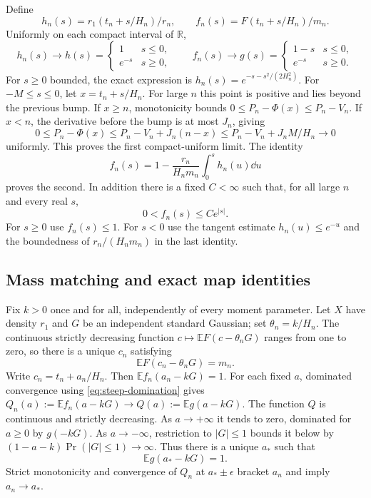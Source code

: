 \documentclass[11pt]{article}
\numberwithin{equation}{section}
\theoremstyle{remark}\newtheorem{remark}[theorem]{Remark}
\newcommand{\R}{\mathbb R}\newcommand{\E}{\mathbb E}
\begin{document}
Define
\[
 h_n(s)=r_1(t_n+s/H_n)/r_n,\qquad
 f_n(s)=F(t_n+s/H_n)/m_n.
\]
Uniformly on each compact interval of $\R$,
\begin{equation}\label{eq:steep-profile}
 h_n(s)\longrightarrow h(s)=
 \begin{cases}1&s\le0,\\e^{-s}&s\ge0,\end{cases}
 \qquad f_n(s)\longrightarrow g(s)=
 \begin{cases}1-s&s\le0,\\e^{-s}&s\ge0.\end{cases}
\end{equation}
For $s\ge0$ bounded, the exact expression is $h_n(s)=e^{-s-s^2/(2H_n^2)}$. For $-M\le s\le0$, let $x=t_n+s/H_n$. For large $n$ this point is positive and lies beyond the previous bump. If $x\ge n$, monotonicity bounds
$0\le P_n-\Phi(x)\le P_n-V_n$. If $x<n$, the derivative before the bump is at most $J_n$, giving
\[
 0\le P_n-\Phi(x)\le P_n-V_n+J_n(n-x)
                \le P_n-V_n+J_nM/H_n\longrightarrow0
\]
uniformly. This proves the first compact-uniform limit. The identity
\[
 f_n(s)=1-\frac{r_n}{H_nm_n}\int_0^s h_n(u)\dd u
\]
proves the second. In addition there is a fixed $C<\infty$ such that, for all large $n$ and every real $s$,
\begin{equation}\label{eq:steep-domination}
 0<f_n(s)\le Ce^{|s|}.
\end{equation}
For $s\ge0$ use $f_n(s)\le1$. For $s<0$ use the tangent estimate $h_n(u)\le e^{-u}$ and the boundedness of $r_n/(H_nm_n)$ in the last identity.

\subsection{Mass matching and exact map identities}
Fix $k>0$ once and for all, independently of every moment parameter. Let $X$ have density $r_1$ and $G$ be an independent standard Gaussian; set $\theta_n=k/H_n$. The continuous strictly decreasing function $c\mapsto\E F(c-\theta_nG)$ ranges from one to zero, so there is a unique $c_n$ satisfying
\begin{equation}\label{eq:steep-match}
 \E F(c_n-\theta_nG)=m_n.
\end{equation}
Write $c_n=t_n+a_n/H_n$. Then $\E f_n(a_n-kG)=1$. For each fixed $a$, dominated convergence using \eqref{eq:steep-domination} gives
$Q_n(a):=\E f_n(a-kG)\to Q(a):=\E g(a-kG)$.
The function $Q$ is continuous and strictly decreasing. As $a\to+\infty$ it tends to zero, dominated for $a\ge0$ by $g(-kG)$. As $a\to-\infty$, restriction to $|G|\le1$ bounds it below by $(1-a-k)\Pr(|G|\le1)\to\infty$. Thus there is a unique $a_*$ such that
\begin{equation}\label{eq:steep-root}
 \E g(a_*-kG)=1.
\end{equation}
Strict monotonicity and convergence of $Q_n$ at $a_*\pm\epsilon$ bracket $a_n$ and imply $a_n\to a_*$.
\end{document}
